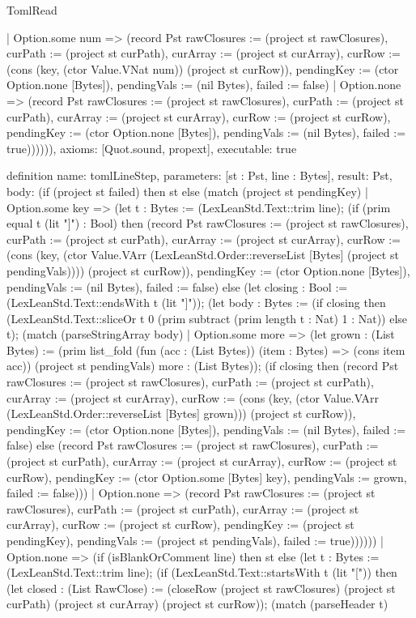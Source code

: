 \begin{lexlean}{TomlRead}
\begin{semanticmodule}
{    | Option.some num => (record Pst {rawClosures := (project st rawClosures), curPath := (project st curPath), curArray := (project st curArray), curRow := (cons (key, (ctor Value.VNat num)) (project st curRow)), pendingKey := (ctor Option.none [Bytes]), pendingVals := (nil Bytes), failed := false})
    | Option.none => (record Pst {rawClosures := (project st rawClosures), curPath := (project st curPath), curArray := (project st curArray), curRow := (project st curRow), pendingKey := (ctor Option.none [Bytes]), pendingVals := (nil Bytes), failed := true})))))),
  axioms: [Quot.sound, propext],
  executable: true
}

definition{
  name: tomlLineStep,
  parameters: [st : Pst, line : Bytes],
  result: Pst,
  body: (if (project st failed) then st else (match (project st pendingKey)
    | Option.some key => (let t : Bytes := (LexLeanStd.Text::trim line); (if (prim equal t (lit "]") : Bool) then (record Pst {rawClosures := (project st rawClosures), curPath := (project st curPath), curArray := (project st curArray), curRow := (cons (key, (ctor Value.VArr (LexLeanStd.Order::reverseList [Bytes] (project st pendingVals)))) (project st curRow)), pendingKey := (ctor Option.none [Bytes]), pendingVals := (nil Bytes), failed := false}) else (let closing : Bool := (LexLeanStd.Text::endsWith t (lit "]")); (let body : Bytes := (if closing then (LexLeanStd.Text::sliceOr t 0 (prim subtract (prim length t : Nat) 1 : Nat)) else t); (match (parseStringArray body)
      | Option.some more => (let grown : (List Bytes) := (prim list_fold (fun (acc : (List Bytes)) (item : Bytes) => (cons item acc)) (project st pendingVals) more : (List Bytes)); (if closing then (record Pst {rawClosures := (project st rawClosures), curPath := (project st curPath), curArray := (project st curArray), curRow := (cons (key, (ctor Value.VArr (LexLeanStd.Order::reverseList [Bytes] grown))) (project st curRow)), pendingKey := (ctor Option.none [Bytes]), pendingVals := (nil Bytes), failed := false}) else (record Pst {rawClosures := (project st rawClosures), curPath := (project st curPath), curArray := (project st curArray), curRow := (project st curRow), pendingKey := (ctor Option.some [Bytes] key), pendingVals := grown, failed := false})))
      | Option.none => (record Pst {rawClosures := (project st rawClosures), curPath := (project st curPath), curArray := (project st curArray), curRow := (project st curRow), pendingKey := (project st pendingKey), pendingVals := (project st pendingVals), failed := true}))))))
    | Option.none => (if (isBlankOrComment line) then st else (let t : Bytes := (LexLeanStd.Text::trim line); (if (LexLeanStd.Text::startsWith t (lit "[")) then (let closed : (List RawClose) := (closeRow (project st rawClosures) (project st curPath) (project st curArray) (project st curRow)); (match (parseHeader t)
}
\end{semanticmodule}
\end{lexlean}
